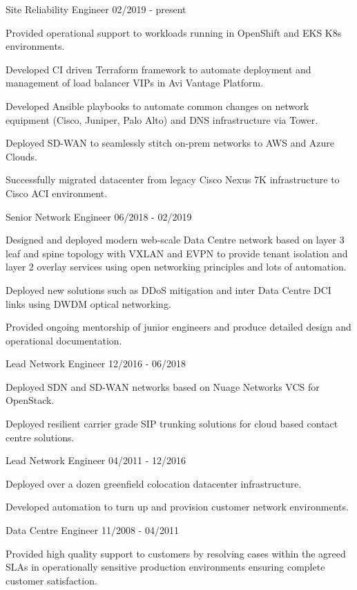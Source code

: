 \documentclass[11pt]{article} %
\begin{document}
\begin{description}
\squish
{}
           {Site Reliability Engineer}
           {02/2019 - present}

Provided operational support to workloads running in OpenShift and EKS K8s environments.

Developed CI driven Terraform framework to automate deployment and management of load balancer VIPs in Avi Vantage Platform.

Developed Ansible playbooks to automate common changes on network equipment (Cisco, Juniper, Palo Alto) and DNS infrastructure via Tower.

Deployed SD-WAN to seamlessly stitch on-prem networks to AWS and Azure Clouds.

Successfully migrated datacenter from legacy Cisco Nexus 7K infrastructure to Cisco ACI environment.

           {Senior Network Engineer}
           {06/2018 - 02/2019}

Designed and deployed modern web-scale Data Centre network based on layer 3 leaf and spine topology with VXLAN and EVPN to provide tenant isolation and layer 2 overlay services using open networking principles and lots of automation.

Deployed new solutions such as DDoS mitigation and inter Data Centre DCI links using DWDM optical networking.

Provided ongoing mentorship of junior engineers and produce detailed design and operational documentation.  
           
           {Lead Network Engineer}
           {12/2016 - 06/2018}

Deployed SDN and SD-WAN networks based on Nuage Networks VCS for OpenStack.

Deployed resilient carrier grade SIP trunking solutions for cloud based contact centre solutions. 

           {Lead Network Engineer}
           {04/2011 - 12/2016}

Deployed over a dozen greenfield colocation datacenter infrastructure.

Developed automation to turn up and provision customer network environments.

           {Data Centre Engineer}
           {11/2008 - 04/2011}

Provided high quality support to customers by resolving cases within the agreed SLAs in operationally sensitive production environments ensuring complete customer satisfaction.


\end{description}
\end{document}
